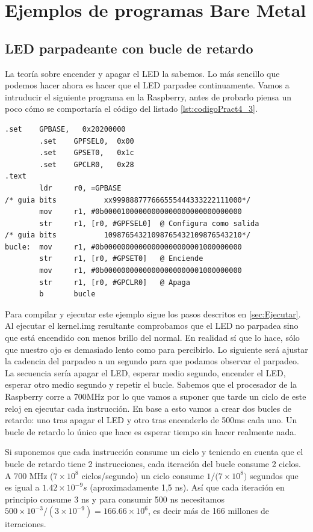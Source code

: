 \section{Ejemplos de programas Bare Metal}

\subsection{LED parpadeante con bucle de retardo}

La teoría sobre encender y apagar el LED la sabemos. Lo más sencillo que podemos hacer ahora
es hacer que el LED parpadee continuamente. Vamos a intruducir el siguiente programa en la
Raspberry, antes de probarlo piensa un poco cómo se comportaría el código del listado \ref{lst:codigoPract4_3}.

\newpage
\begin{lstlisting}[caption={esbn3.s},label={lst:codigoPract4_3}]
        .set    GPBASE,   0x20200000
        .set    GPFSEL0,  0x00
        .set    GPSET0,   0x1c
        .set    GPCLR0,   0x28
.text
        ldr     r0, =GPBASE
/* guia bits           xx999888777666555444333222111000*/
        mov     r1, #0b00001000000000000000000000000000
        str     r1, [r0, #GPFSEL0]  @ Configura como salida
/* guia bits           10987654321098765432109876543210*/
bucle:  mov     r1, #0b00000000000000000000001000000000
        str     r1, [r0, #GPSET0]   @ Enciende
        mov     r1, #0b00000000000000000000001000000000
        str     r1, [r0, #GPCLR0]   @ Apaga
        b       bucle
\end{lstlisting}

Para compilar y ejecutar este ejemplo sigue los pasos descritos en \ref{sec:Ejecutar}.
Al ejecutar el kernel.img resultante comprobamos que el LED no parpadea sino que está encendido con menos brillo del normal.
En realidad sí que lo hace, sólo que nuestro ojo es demasiado lento como para percibirlo.
Lo siguiente será ajustar la cadencia del parpadeo a un segundo para que podamos observar
el parpadeo. La secuencia sería apagar el LED, esperar medio segundo, encender el LED,
esperar otro medio segundo y repetir el bucle. Sabemos que el procesador de la Raspberry
corre a 700MHz por lo que vamos a suponer que tarde un ciclo de este reloj en ejecutar
cada instrucción. En base a esto vamos a crear dos bucles de retardo: uno tras apagar el LED
y otro tras encenderlo de 500ms cada uno. Un bucle de retardo lo único que hace es esperar
tiempo sin hacer realmente nada.

Si suponemos que cada instrucción consume un ciclo y teniendo en cuenta que el bucle de
retardo tiene 2 instrucciones, cada iteración del bucle consume 2 ciclos. A 700 MHz
($7\times10^{8}$ ciclos/segundo) un ciclo consume $1/({7\times10^{8})}$ segundos que es igual a
$1.42\times10^{-9} s$ (aproximadamente 1,5 ns). Así que cada iteración en principio
consume 3 ns y para consumir 500 ns necesitamos ${500\times10^{-3}/({3\times10^{-9}})}=166.66\times10^{6}$,
es decir más de 166 millones de iteraciones.

